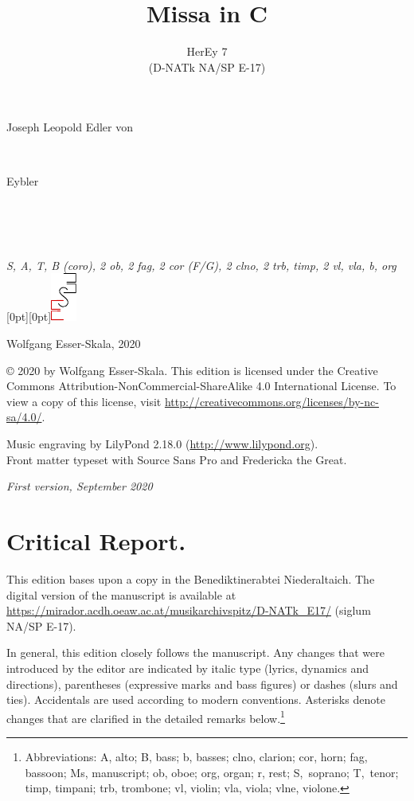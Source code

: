\documentclass[parskip=full]{scrreprt}
\makeatletter
\DeclareRobustCommand{\sbseries}{\fontseries{sb}\selectfont}
\newcommand\fancytitlehead{
	\headingfont%
	\fontsize{80}{80}\selectfont\textcolor{black!80}{\@ifundefined{@shortname}{\@lastname}{\@shortname}.}\\[15pt]%
	\fontsize{60}{60}\selectfont\@ifundefined{@shorttitle}{\@title}{\@shorttitle}.%
}
\def\firstname#1{\def\@firstname{#1}}
\def\lastname#1{\def\@lastname{#1}}
\def\instrumentation#1{\def\@instrumentation{#1}}
\def\maketitle{%
\begin{titlepage}%
	\Large%
	{\@titlehead}%
	\vfill%
	{\strut\@firstname}\\%
	{\sbseries\color{oldred}\strut\@lastname}\\%
	{\strut\@namesuffix}%
	\vfill%
	{\sbseries\@title}\\%
	{\@subtitle}\\[\baselineskip]%
	{\itshape\@instrumentation}%
	\vfill%
	{\itshape\@parts}\hspace*{\fill}\raisebox{0pt}[0pt][0pt]{\includegraphics{ees_logo}}%
\end{titlepage}%
}
\newif\ifprintreport\printreportfalse
\makeatother
\begin{document}
\frenchspacing

\titlehead{\fancytitlehead}
\firstname{Joseph Leopold Edler von}
\lastname{Eybler}
\title{Missa in C}
\subtitle{HerEy 7\\(D-NATk NA/SP E-17)}
\instrumentation{S, A, T, B (coro), 2 ob, 2 fag, 2 cor (F/G), 2 clno, 2 trb, timp, 2 vl, vla, b, org}
\maketitle


\thispagestyle{empty}

\vspace*{\fill}

\hspace*{1em}Wolfgang Esser-Skala, 2020

© 2020 by Wolfgang Esser-Skala. This edition is licensed under the Creative Commons Attribution-NonCommercial-ShareAlike 4.0 International License. To view a copy of this license, visit \url{http://creativecommons.org/licenses/by-nc-sa/4.0/}. 

Music engraving by LilyPond 2.18.0 (\url{http://www.lilypond.org}).\\
Front matter typeset with Source Sans Pro and Fredericka the Great.

\textit{First version, September 2020}

\vspace*{2cm}

\ifprintreport
\chapter*{Critical Report.}

This edition bases upon a copy in the Benediktinerabtei Niederaltaich. The digital version of the manuscript is available at \url{https://mirador.acdh.oeaw.ac.at/musikarchivspitz/D-NATk_E17/} (siglum NA/SP E-17).

In general, this edition closely follows the manuscript. Any changes that were introduced by the editor are indicated by italic type (lyrics, dynamics and directions), parentheses (expressive marks and bass figures) or dashes (slurs and ties). Accidentals are used according to modern conventions. Asterisks denote changes that are clarified in the detailed remarks below.\footnote{Abbreviations: A, alto; B, bass; b, basses; clno, clarion; cor, horn; fag, bassoon; Ms, manuscript; ob, oboe; org, organ; r, rest; S,~soprano; T,~tenor; timp, timpani; trb, trombone; vl, violin; vla, viola; vlne, violone.}
\end{document}
